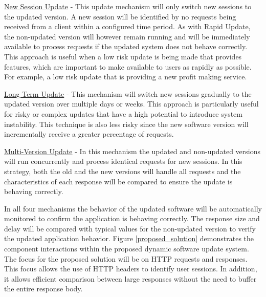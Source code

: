 \documentclass[a4paper,11pt,twoside]{article}
\begin{document}
\underline{New Session Update} - This update mechanism will only switch new sessions to the updated version. A new session will be identified by no requests being received from a client within a configured time period. As with Rapid Update, the non-updated version will however remain running and will be immediately available to process requests if the updated system does not behave correctly. This approach is useful when a low risk update is being made that provides features, which are important to make available to users as rapidly as possible. For example, a low risk update that is providing a new profit making service.

\underline{Long Term Update} - This mechanism will switch new sessions gradually to the updated version over multiple days or weeks. This approach is particularly useful for risky or complex updates that have a high potential to introduce system instability. This technique is also less risky since the new software version will incrementally receive a greater percentage of requests.

\underline{Multi-Version Update} - In this mechanism the updated and non-updated versions will run concurrently and  process identical requests for new sessions.  In this strategy, both the old and the new versions will handle all requests and the characteristics of each response will be compared to ensure the update is behaving correctly.

In all four mechanisms the behavior of the updated software will be automatically monitored to confirm the application is behaving correctly. The response size and delay will be compared with typical values for the non-updated version to verify the updated application behavior. Figure \ref{proposed_solution} demonstrates the component interactions within the proposed dynamic software update system.  The focus for the proposed solution will be on HTTP requests and responses.  This focus allows the use of HTTP headers to identify user sessions.  In addition, it allows efficient comparison between large responses without the need to buffer the entire response body.\\\\
\end{document}
